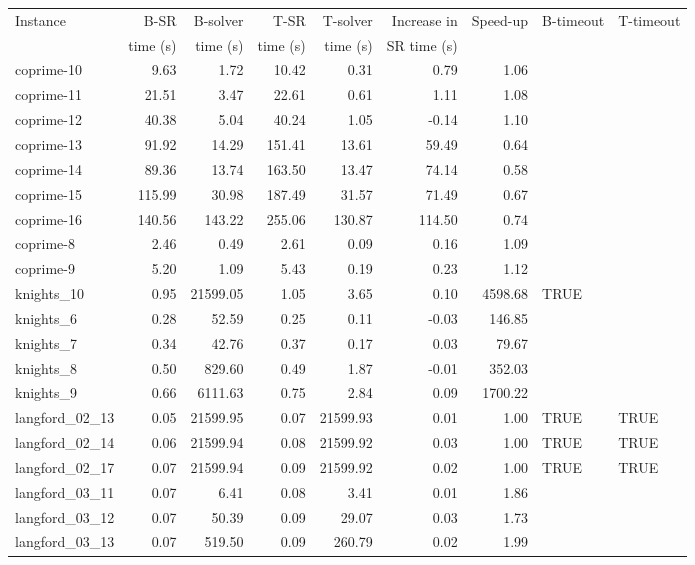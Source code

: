 \documentclass[runningheads]{llncs}
\begin{document}
\begin{table}[ht]
\centering
\begin{tabular}{lrrrrrrll}
  \hline
Instance & B-SR     & B-solver & T-SR      & T-solver  & Increase in & Speed-up & B-timeout & T-timeout \\
         & time (s) & time (s) & time (s)  & time (s)  & SR time (s)  & & & \\
  \hline
coprime-10 & 9.63 & 1.72 & 10.42 & 0.31 & 0.79 & 1.06 &   &   \\ 
coprime-11 & 21.51 & 3.47 & 22.61 & 0.61 & 1.11 & 1.08 &   &   \\ 
coprime-12 & 40.38 & 5.04 & 40.24 & 1.05 & -0.14 & 1.10 &   &   \\ 
coprime-13 & 91.92 & 14.29 & 151.41 & 13.61 & 59.49 & 0.64 &   &   \\ 
coprime-14 & 89.36 & 13.74 & 163.50 & 13.47 & 74.14 & 0.58 &   &   \\ 
coprime-15 & 115.99 & 30.98 & 187.49 & 31.57 & 71.49 & 0.67 &   &   \\ 
coprime-16 & 140.56 & 143.22 & 255.06 & 130.87 & 114.50 & 0.74 &   &   \\ 
coprime-8 & 2.46 & 0.49 & 2.61 & 0.09 & 0.16 & 1.09 &   &   \\ 
coprime-9 & 5.20 & 1.09 & 5.43 & 0.19 & 0.23 & 1.12 &   &   \\ 
 knights\_10 & 0.95 & 21599.05 & 1.05 & 3.65 & 0.10 & 4598.68 & TRUE &   \\ 
 knights\_6 & 0.28 & 52.59 & 0.25 & 0.11 & -0.03 & 146.85 &   &   \\ 
 knights\_7 & 0.34 & 42.76 & 0.37 & 0.17 & 0.03 & 79.67 &   &   \\ 
 knights\_8 & 0.50 & 829.60 & 0.49 & 1.87 & -0.01 & 352.03 &   &   \\ 
 knights\_9 & 0.66 & 6111.63 & 0.75 & 2.84 & 0.09 & 1700.22 &   &   \\ 
 langford\_02\_13 & 0.05 & 21599.95 & 0.07 & 21599.93 & 0.01 & 1.00 & TRUE & TRUE \\ 
 langford\_02\_14 & 0.06 & 21599.94 & 0.08 & 21599.92 & 0.03 & 1.00 & TRUE & TRUE \\ 
 langford\_02\_17 & 0.07 & 21599.94 & 0.09 & 21599.92 & 0.02 & 1.00 & TRUE & TRUE \\ 
 langford\_03\_11 & 0.07 & 6.41 & 0.08 & 3.41 & 0.01 & 1.86 &   &   \\ 
 langford\_03\_12 & 0.07 & 50.39 & 0.09 & 29.07 & 0.03 & 1.73 &   &   \\ 
 langford\_03\_13 & 0.07 & 519.50 & 0.09 & 260.79 & 0.02 & 1.99 &   &   \\ 

\end{tabular}
\end{table}
\end{document}
